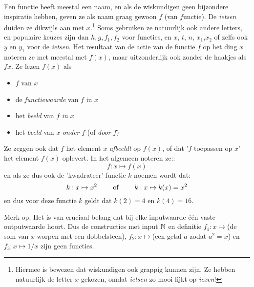\documentclass{ximera}
\begin{document}
Een functie heeft meestal een naam, en als de wiskundigen geen bijzondere inspiratie hebben, geven ze als naam graag gewoon $f$ (van $f$unctie). De \textit{ietsen} duiden ze dikwijls aan met $x$.\footnote{Hiermee is bewezen dat wiskundigen ook grappig kunnen zijn. Ze hebben natuurlijk de letter $x$ gekozen, omdat \textit{ietsen} zo mooi lijkt op \textit{iexen}!} Soms gebruiken ze natuurlijk ook andere letters, en populaire keuzes zijn dan $h,g,f_1, f_2$ voor functies, en $x$, $t$, $n$, $x_1$,$x_2$ of zelfs ook $y$ en $y_1$  voor de \textit{ietsen}. Het resultaat van de actie van de functie $f$ op het ding $x$ noteren ze met meestal met $f(x)$, maar uitzonderlijk ook zonder de haakjes als $fx$. Ze lezen $f(x)$ als 
\begin{itemize}
\item $f$ van $x$
\item de \textit{functiewaarde} van $f$ in $x$
\item het \textit{beeld} van $f$ \textit{in} $x$
\item het \textit{beeld} van $x$ \textit{onder} $f$ (of \textit{door} $f$)
\end{itemize}
Ze zeggen ook dat $f$ het element $x$ \textit{afbeeldt} op $f(x)$, of dat '$f$ toepassen op $x$' het element $f(x)$ oplevert. In het algemeen noteren ze::
$$
f: x \mapsto f(x) 
$$
en als ze dus ook de 'kwadrateer'-functie $k$ noemen wordt dat:
$$
k: x \mapsto x^2 \text{ \qquad of \qquad }  k: x \mapsto k(x) = x^2
$$
en dus voor deze functie $k$ geldt dat $k(2)=4$ en $k(4)=16$.

\begin{center}
\end{center}

Merk op:    
 Het is van cruciaal belang dat bij elke inputwaarde één vaste outputwaarde hoort. Dus de constructies met input $\mathbb{N}$ en definitie $f_1: x\mapsto $(de som van $x$ worpen met een dobbelsteen), $f_2: x\mapsto $(een getal $a$ zodat $a^2=x$) en $f_3:x\mapsto 1/x$ zijn geen functies.
 
\end{document}
